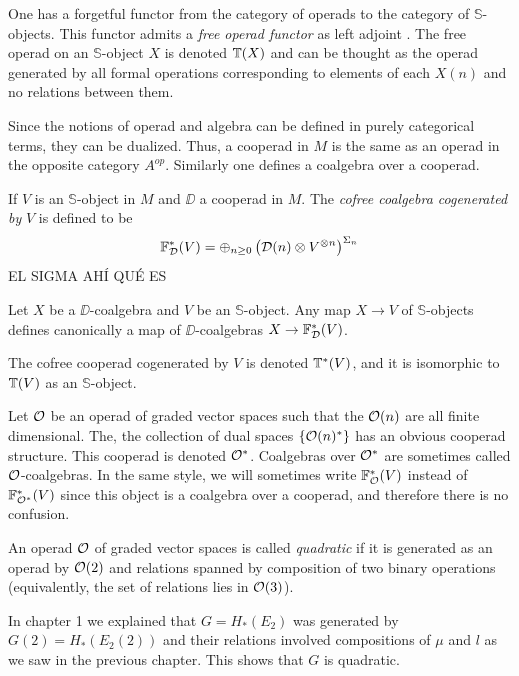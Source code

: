 \documentclass[TFM.tex]{subfiles}
\begin{document}
One has a forgetful functor from the category of operads to the category of $\mathbb{S}$-objects. This functor admits a \emph{free operad functor} as left adjoint \cite{GJHinich}. The free operad on an $\mathbb{S}$-object $X$ is denoted $\mathbb{T}(X)$ and can be thought as the operad generated by all formal operations corresponding to elements of each $X(n)$ and no relations between them.

Since the notions of operad and algebra can be defined in purely categorical terms, they can be dualized. Thus, a cooperad in $M$ is
the same as an operad in the opposite category $A^{op}$. Similarly one defines a coalgebra over a cooperad.


\begin{defi}
If $V$ is an $\mathbb{S}$-object in $M$ and $\DD$ a cooperad in $M$. The \emph{cofree coalgebra cogenerated by }$V$ is defined to be
\[
\mathbb{F}^*_{\mathcal{D}}(V)=\oplus_{n\geq 0}\left(\mathcal{D}(n)\otimes V^{\otimes n}\right)^{\Sigma_n}
\]
EL SIGMA AHÍ QUÉ ES
\end{defi}

Let $X$ be a $\DD$-coalgebra and $V$ be an $\mathbb{S}$-object. Any map $X\to V$ of $\mathbb{S}$-objects defines canonically a map of $\DD$-coalgebras $X\to \mathbb{F}_{\mathcal{D}}^*(V)$.  

The cofree cooperad cogenerated by $V$ is denoted $\mathbb{T}^*(V)$, and it is isomorphic to $\mathbb{T}(V)$ as an $\mathbb{S}$-object. 

\begin{remark}
Let ${\mathcal O}$ be an operad of graded vector spaces such that the ${\mathcal O}(n)$ are all finite dimensional. The, the collection of dual spaces $\{{\mathcal O}(n)^*\}$ has an obvious cooperad structure. This cooperad is denoted ${\mathcal O}^*$. Coalgebras over ${\mathcal O}^*$ are sometimes called ${\mathcal O}$-coalgebras. In the same style, we will sometimes write $\mathbb{F}^*_{\mathcal O}(V)$ instead of $\mathbb{F}^*_{{\mathcal O}^*}(V)$ since this object is a coalgebra over a cooperad, and therefore there is no confusion.
\end{remark}

\begin{defi}
An operad ${\mathcal O}$ of graded vector spaces is called \emph{quadratic} if it is generated as an operad by ${\mathcal O}(2)$ and relations spanned by composition of two binary operations (equivalently, the set of relations lies in ${\mathcal O}(3)$). 
\end{defi}

In chapter 1 we explained that $G=H_*(E_2)$ was generated by $G(2)=H_*(E_2(2))$ and their relations involved compositions of $\mu$ and $l$ as we saw in the previous chapter. This shows that $G$ is quadratic. %
\end{document}
